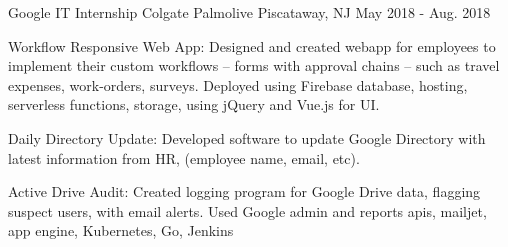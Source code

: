 \begin{cventries}
  \cventry
  {Google IT Internship} %
  {Colgate Palmolive} %
  {Piscataway, NJ} %
  {May 2018 - Aug. 2018} %
  {
    \begin{cvitems} %
      \item {Workflow Responsive Web App: Designed and created webapp for employees to implement their custom workflows -- forms with approval chains -- such as travel expenses, work-orders, surveys. Deployed using Firebase database, hosting, serverless functions,
      storage, using jQuery and Vue.js for UI.}
      \item {Daily Directory Update: Developed software to update Google Directory with latest information from HR, (employee name, email, etc).}
      \item {Active Drive Audit: Created logging program for Google Drive data, flagging suspect users, with email alerts. Used Google admin and reports apis, mailjet, app engine, Kubernetes, Go, Jenkins}
    \end{cvitems}
  }

\end{cventries}
